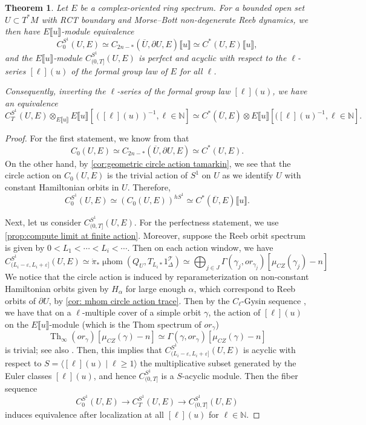 \documentclass[11pt]{amsart}
\numberwithin{equation}{section}
\theoremstyle{plain}
\newtheorem{Thm}{Theorem}[section]
\theoremstyle{definition}
\theoremstyle{remark}
\newcommand{\bN} { {\mathbb{N}}}
\newcommand{\sT} { {\mathscr{T}}}
\newcommand{\fpw}[1]{{\llbracket #1\rrbracket}}
\newcommand{\Thom}{\operatorname{Th}}
\newcommand\mhom{\operatorname{\mu hom}}
\begin{document}
\begin{Thm}\label{thm: localization}
Let $E$ be a complex-oriented ring spectrum. For a bounded open set $U\subset T^*M$ with RCT boundary and Morse--Bott non-degenerate Reeb dynamics, we then have $E\fpw{u}$-module equivalence
\[C^{S^1}_0(U ,E) \simeq C_{2n-*}(\overline{U},\partial U,E)\fpw{u}\simeq C^*( {U},E)\fpw{u},\]
and the $E\fpw{u}$-module 
$C^{S^1}_{(0,T]}(U ,E) $
is perfect and acyclic with respect to the $\ell$-series $[\ell](u)$ of the formal group law of $E$ for all $\ell$. 

Consequently,
inverting the $\ell$-series of the formal group law $[\ell](u)$, we have an equivalence 
\[C^{S^1}_T(U ,E)\otimes_{E\fpw{u}} E\fpw{u}[([\ell](u))^{-1}, \ell \in \bN] \simeq C^*(\overline{U} ,E)\otimes E\fpw{u}[([\ell](u)^{-1}, \ell \in \bN].\]
\end{Thm}
\begin{proof}
For the first statement, we know from \cite[Theorem 7.20]{Hochschild-Kuo-Shende-Zhang} that
\[C_0(U ,E)\simeq C_{2n-*}(\overline{U},\partial U,E)\simeq  C^*(U ,E).\]
On the other hand, by \autoref{cor:geometric circle action tamarkin}, we see that the circle action on $C_0(U ,E)$ is the trivial action of $S^1$ on $ {U}$ as we  identify $ {U}$ with constant Hamiltonian orbits in $ {U}$. Therefore, 
\[C^{S^1}_0(U ,E)\simeq (C_0(U ,E))^{hS^1}\simeq C^*(\overline{U} ,E)\fpw{u}.\]


Next, let us consider $C^{S^1}_{(0,T]}(U ,E)$. For the perfectness statement, we use \autoref{prop:compute limit at finite action}. Moreover, suppose the Reeb orbit spectrum is given by $0 < L_1 < \cdots < L_i < \cdots$. Then on each action window, we have 
\[C^{S^1}_{(L_i-\varepsilon,L_{i}+\varepsilon]}(U ,E) \simeq \dot\pi_*\mhom(Q_U, T_{L_i*}1_{\Delta}^\sT) \simeq \bigoplus_{j\in J}\Gamma(\gamma_j, or_{\gamma_j})[\mu_{CZ}(\gamma_j)-n]\]
We notice that the circle action is induced by reparameterization on non-constant Hamiltonian orbits given by $H_\alpha$ for large enough $\alpha$, which correspond to Reeb orbits of $\partial U$, by \autoref{cor: mhom circle action trace}. Then by the $C_\ell$-Gysin sequence \cite[Proposition 2.25]{Li-Zhang26-1}, we have that on a $\ell$-multiple cover of a simple orbit $\gamma$, the action of $[\ell](u)$ on the $E\fpw{u}$-module (which is the Thom spectrum of $or_\gamma$)
\[\Thom_\infty(or_\gamma)[\mu_{CZ}(\gamma)-n] \simeq \Gamma(\gamma, or_{\gamma})[\mu_{CZ}(\gamma)-n]\]
is trivial; see also \cite[Lemma 2.10]{CoteKartal24}. Then, this implies that $C^{S^1}_{(L_i-\varepsilon,L_{i}+\varepsilon]}(U ,E)$ is acyclic with respect to $S=\langle [\ell](u) \mid \ell \geq 1 \rangle$ the multiplicative subset generated by the Euler classes $[\ell](u)$, and hence $C^{S^1}_{(0,T]}$ is a $S$-acyclic module. 
Then the fiber sequence 
\[C^{S^1}_0(U ,E) \rightarrow  C^{S^1}_T(U ,E)\to C^{S^1}_{(0,T]}(U ,E)\]
induces equivalence after localization at all $[\ell](u)$ for $\ell \in \bN$.\end{proof}
\end{document}

